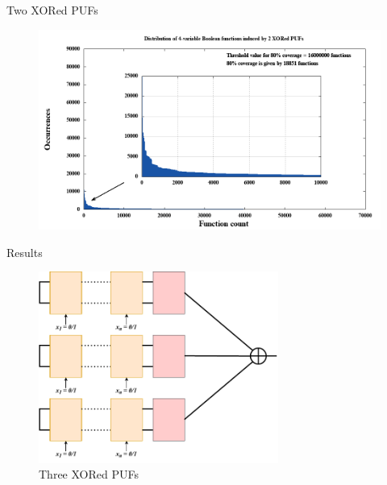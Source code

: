 \documentclass[10pt, compress]{beamer}
\begin{document}
\begin{frame}{Two XORed PUFs}
    \begin{figure}
        \centering
        \includegraphics[width=\textwidth]{figures/zoom/distribution_of_4-variable_boolean_functions_induced_by_2_xored_pufs_zoom.png}
    \end{figure}
\end{frame}


\begin{frame}{Results}
    \begin{figure}
        \centering
        \includegraphics[width=0.7\textwidth]{figures/puf_3_xor.pdf}
        \caption{Three XORed PUFs}
    \end{figure}
\end{frame}
\end{document}
